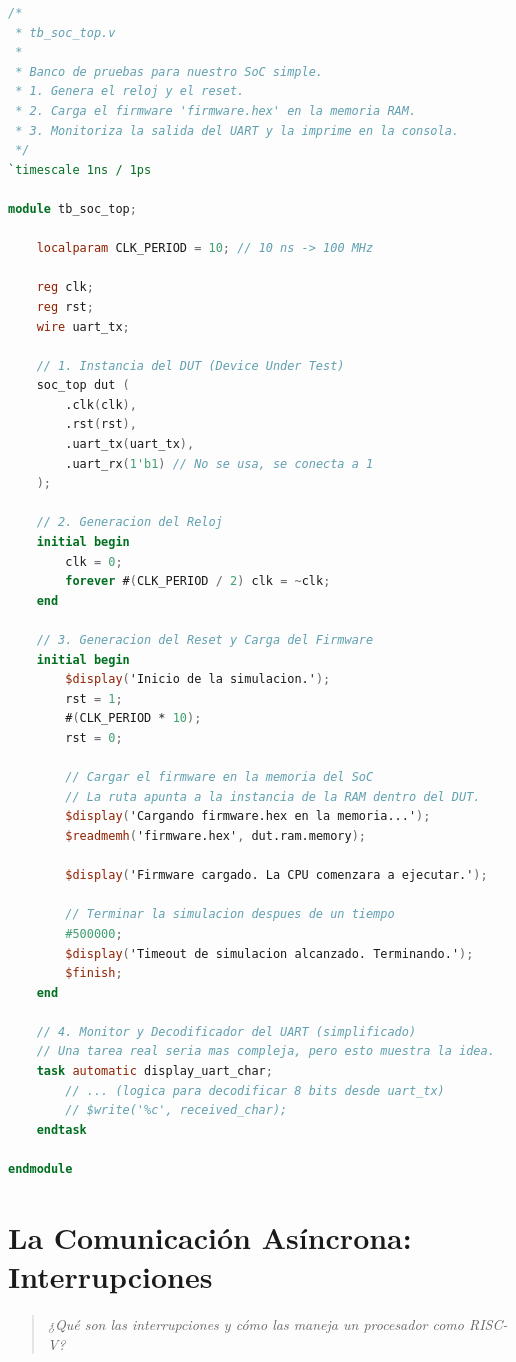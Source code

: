 \documentclass[12pt,a4paper]{article}
\newenvironment{pregunta}
  {\begin{leftbar}\begin{quote}\itshape}
  {\end{quote}\end{leftbar}}
\begin{document}
\begin{lstlisting}[language=Verilog, caption={tb\_soc\_top.v}]
/*
 * tb_soc_top.v
 *
 * Banco de pruebas para nuestro SoC simple.
 * 1. Genera el reloj y el reset.
 * 2. Carga el firmware 'firmware.hex' en la memoria RAM.
 * 3. Monitoriza la salida del UART y la imprime en la consola.
 */
`timescale 1ns / 1ps

module tb_soc_top;

    localparam CLK_PERIOD = 10; // 10 ns -> 100 MHz

    reg clk;
    reg rst;
    wire uart_tx;

    // 1. Instancia del DUT (Device Under Test)
    soc_top dut (
        .clk(clk),
        .rst(rst),
        .uart_tx(uart_tx),
        .uart_rx(1'b1) // No se usa, se conecta a 1
    );

    // 2. Generacion del Reloj
    initial begin
        clk = 0;
        forever #(CLK_PERIOD / 2) clk = ~clk;
    end

    // 3. Generacion del Reset y Carga del Firmware
    initial begin
        $display('Inicio de la simulacion.');
        rst = 1;
        #(CLK_PERIOD * 10);
        rst = 0;
        
        // Cargar el firmware en la memoria del SoC
        // La ruta apunta a la instancia de la RAM dentro del DUT.
        $display('Cargando firmware.hex en la memoria...');
        $readmemh('firmware.hex', dut.ram.memory);
        
        $display('Firmware cargado. La CPU comenzara a ejecutar.');

        // Terminar la simulacion despues de un tiempo
        #500000;
        $display('Timeout de simulacion alcanzado. Terminando.');
        $finish;
    end

    // 4. Monitor y Decodificador del UART (simplificado)
    // Una tarea real seria mas compleja, pero esto muestra la idea.
    task automatic display_uart_char;
        // ... (logica para decodificar 8 bits desde uart_tx)
        // $write('%c', received_char);
    endtask

endmodule
\end{lstlisting}

\newpage
\section{La Comunicación Asíncrona: Interrupciones}

\begin{pregunta}
¿Qué son las interrupciones y cómo las maneja un procesador como RISC-V?
\end{pregunta}
\end{document}
